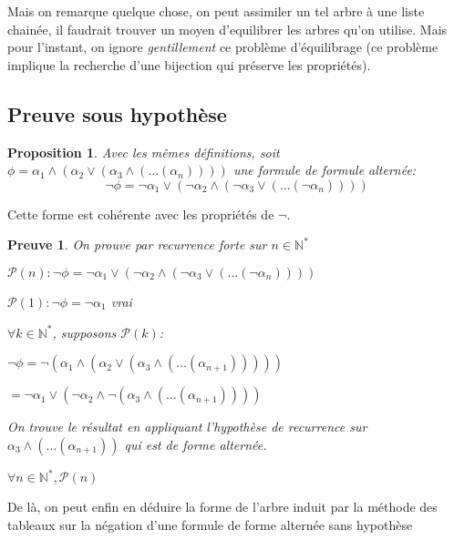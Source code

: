 \documentclass{paper}
\newtheorem{prop}{Proposition}
\newtheorem{preuve}{Preuve}
\begin{document}
Mais on remarque quelque chose, on peut assimiler un tel arbre à une liste chainée, il faudrait trouver un moyen d'equilibrer les arbres qu'on utilise.
Mais pour l'instant, on ignore \textit{gentillement} ce problème d'équilibrage (ce problème implique la recherche d'une bijection qui préserve les propriétés).










\subsection{Preuve sous hypothèse}

\begin{prop}
    Avec les mêmes définitions, soit $\phi = \alpha_1 \land (\alpha_2 \lor (\alpha_3 \land (\dots (\alpha_n))))$ une formule de formule alternée:
    $$\lnot\phi = \lnot\alpha_1 \lor (\lnot\alpha_2 \land (\lnot\alpha_3 \lor (\dots (\lnot\alpha_n))))$$
\end{prop}
Cette forme est cohérente avec les propriétés de $\lnot$.

\begin{preuve}
    On prouve par recurrence forte sur $n\in\mathbb{N}^*$

    $\mathcal{P}(n): \lnot\phi = \lnot\alpha_1 \lor (\lnot\alpha_2 \land (\lnot\alpha_3 \lor (\dots (\lnot\alpha_n))))$

    $\mathcal{P}(1): \lnot\phi = \lnot\alpha_1$ vrai

    $\forall k\in\mathbb{N}^*$, supposons $\mathcal{P}(k)$:

    $\lnot\phi = \lnot (\alpha_1 \land (\alpha_2 \lor (\alpha_3 \land (\dots (\alpha_{n+1})))))$

    $= \lnot\alpha_1 \lor (\lnot\alpha_2 \land \lnot(\alpha_3 \land (\dots (\alpha_{n+1}))))$

    On trouve le résultat en appliquant l'hypothèse de recurrence sur $\alpha_3 \land (\dots (\alpha_{n+1}))$ qui est de forme alternée.

    $\forall n\in\mathbb{N}^*, \mathcal{P}(n)$
\end{preuve}

De là, on peut enfin en déduire la forme de l'arbre induit par la méthode des tableaux sur la négation d'une formule de forme alternée sans hypothèse

\end{document}
